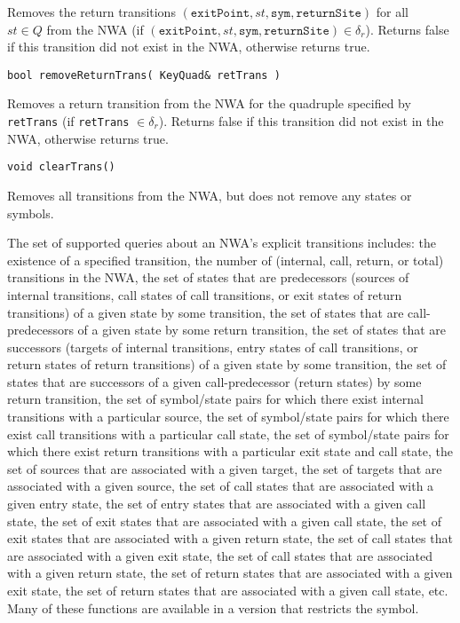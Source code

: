 \begin{description}
    Removes the return transitions
    $(\texttt{exitPoint},st,\texttt{sym},\texttt{returnSite})$ for all \\$st
    \in Q$ from the NWA (if
    $(\texttt{exitPoint},st,\texttt{sym},\texttt{returnSite}) \in \delta_r$).
    Returns false if this transition did not exist in the NWA, otherwise
    returns true.

  \item\texttt{bool removeReturnTrans( KeyQuad\& retTrans )} \nopagebreak

    Removes a return transition from the NWA for the quadruple specified by
    \texttt{retTrans} (if \texttt{retTrans} $\in \delta_r$).  Returns false
    if this transition did not exist in the NWA, otherwise returns true.

  \item\texttt{void clearTrans()} \nopagebreak

    Removes all transitions from the NWA, but does not remove any states or
    symbols. \\

\end{description}

The set of supported queries about an NWA's explicit transitions includes:
the existence of a specified transition, the number of (internal, call,
return, or total) transitions in the NWA, the set of states that are
predecessors (sources of internal transitions, call states of call
transitions, or exit states of return transitions) of a given state by some
transition, the set of states that are call-predecessors of a given state by
some return transition, the set of states that are successors (targets of
internal transitions, entry states of call transitions, or return states of
return transitions) of a given state by some transition, the set of states
that are successors of a given call-predecessor (return states) by some
return transition, the set of symbol/state pairs for which there exist
internal transitions with a particular source, the set of symbol/state pairs
for which there exist call transitions with a particular call state, the set
of symbol/state pairs for which there exist return transitions with a
particular exit state and call state, the set of sources that are associated
with a given target, the set of targets that are associated with a given
source, the set of call states that are associated with a given entry state,
the set of entry states that are associated with a given call state, the set
of exit states that are associated with a given call state, the set of exit
states that are associated with a given return state, the set of call states
that are associated with a given exit state, the set of call states that are
associated with a given return state, the set of return states that are
associated with a given exit state, the set of return states that are
associated with a given call state, etc.  Many of these functions are
available in a version that restricts the symbol. \\

